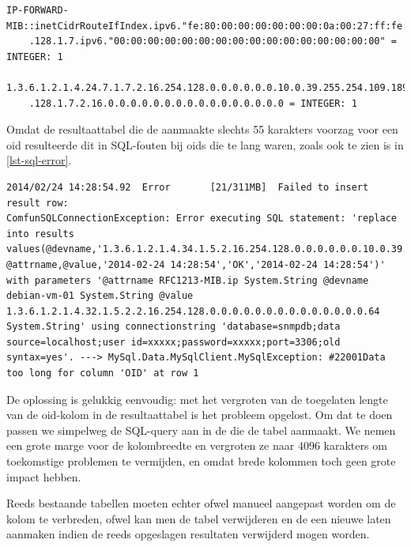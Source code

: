 \begin{lstlisting}[float=h, caption={[Tekstuele en numerieke notatie van een OID uit inetCidrRouteTable]Tekstuele en numerieke notatie van een \gls{oid} uit inetCidrRouteTable}, label=lst-lange-oids]
IP-FORWARD-MIB::inetCidrRouteIfIndex.ipv6."fe:80:00:00:00:00:00:00:0a:00:27:ff:fe:6d:bd:c5"
	.128.1.7.ipv6."00:00:00:00:00:00:00:00:00:00:00:00:00:00:00:00" = INTEGER: 1

1.3.6.1.2.1.4.24.7.1.7.2.16.254.128.0.0.0.0.0.0.10.0.39.255.254.109.189.197
	.128.1.7.2.16.0.0.0.0.0.0.0.0.0.0.0.0.0.0.0.0 = INTEGER: 1
\end{lstlisting}

Omdat de resultaattabel die de \nwmretriever{} aanmaakte slechts 55 karakters voorzag voor een \gls{oid} resulteerde dit
in SQL-fouten bij \glspl{oid} die te lang waren, zoals ook te zien is in \cref{lst-sql-error}.


\begin{lstlisting}[float=h, caption={[SQL-fout bij te lange OID]SQL-fout bij te lange \glspl{oid}}, label=lst-sql-error]
2014/02/24 14:28:54.92	Error		[21/311MB]	Failed to insert result row: 
ComfunSQLConnectionException: Error executing SQL statement: 'replace into results values(@devname,'1.3.6.1.2.1.4.34.1.5.2.16.254.128.0.0.0.0.0.0.10.0.39.255.254.109.189.197', @attrname,@value,'2014-02-24 14:28:54','OK','2014-02-24 14:28:54')' with parameters '@attrname RFC1213-MIB.ip System.String @devname debian-vm-01 System.String @value 1.3.6.1.2.1.4.32.1.5.2.2.16.254.128.0.0.0.0.0.0.0.0.0.0.0.0.0.0.64 System.String' using connectionstring 'database=snmpdb;data source=localhost;user id=xxxxx;password=xxxxx;port=3306;old syntax=yes'. ---> MySql.Data.MySqlClient.MySqlException: #22001Data too long for column 'OID' at row 1
\end{lstlisting}

De oplossing is gelukkig eenvoudig: met het vergroten van de toegelaten lengte van de \gls{oid}-kolom in de resultaattabel is het probleem opgelost.
Om dat te doen passen we simpelweg de SQL-query aan in de \nwmretriever{} die de tabel aanmaakt.
We nemen een grote marge voor de kolombreedte en vergroten ze naar 4096 karakters om toekomstige problemen te vermijden,
en omdat brede kolommen toch geen grote impact hebben.

Reeds bestaande tabellen moeten echter ofwel manueel aangepast worden om de kolom te verbreden,
ofwel kan men de tabel verwijderen en de \nwmretriever{} een nieuwe laten aanmaken indien de reeds opgeslagen resultaten verwijderd mogen worden.


